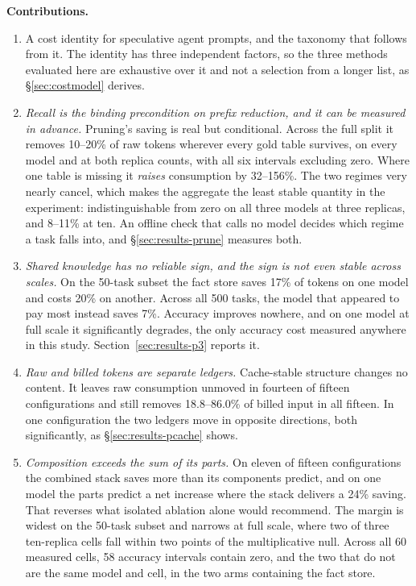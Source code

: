 \documentclass[conference]{IEEEtran}
\begin{document}
\textbf{Contributions.}

\begin{enumerate}
\item A cost identity for speculative agent prompts, and the taxonomy that
follows from it. The identity has three independent factors, so the three
methods evaluated here are exhaustive over it and not a selection from a longer
list, as §\ref{sec:costmodel} derives.
\item \emph{Recall is the binding precondition on prefix reduction, and it can
be measured in advance.} Pruning's saving is real but conditional. Across the
full split it removes 10--20\% of raw tokens wherever every gold table survives,
on every model and at both replica counts, with all six intervals excluding
zero. Where one table is missing it \emph{raises} consumption by 32--156\%. The
two regimes very nearly cancel, which makes the aggregate the least stable
quantity in the experiment: indistinguishable from zero on all three models at
three replicas, and 8--11\% at ten. An offline check that calls no model decides
which regime a task falls into, and §\ref{sec:results-prune} measures both.
\item \emph{Shared knowledge has no reliable sign, and the sign is not even
stable across scales.} On the 50-task subset the fact store saves 17\% of tokens
on one model and costs 20\% on another. Across all 500 tasks, the model that
appeared to pay most instead saves 7\%. Accuracy improves nowhere, and on one
model at full scale it significantly degrades, the only accuracy cost measured
anywhere in this study. Section~\ref{sec:results-p3} reports it.
\item \emph{Raw and billed tokens are separate ledgers.} Cache-stable structure
changes no content. It leaves raw consumption unmoved in fourteen of fifteen
configurations and still removes 18.8--86.0\% of billed input in all fifteen. In
one configuration the two ledgers move in opposite directions, both
significantly, as §\ref{sec:results-pcache} shows.
\item \emph{Composition exceeds the sum of its parts.} On eleven of fifteen
configurations the combined stack saves more than its components predict, and on
one model the parts predict a net increase where the stack delivers a 24\%
saving. That reverses what isolated ablation alone would recommend. The margin
is widest on the 50-task subset and narrows at full scale, where two of three
ten-replica cells fall within two points of the multiplicative null. Across all
60 measured cells, 58 accuracy
intervals contain zero, and the two that do not are the same model and cell, in
the two arms containing the fact store.
\end{enumerate}
\end{document}
